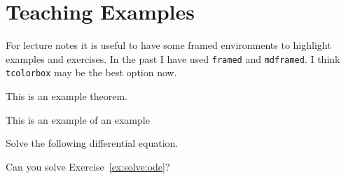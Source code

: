 
\section{Teaching Examples}

For lecture notes it is useful to have some framed environments to highlight examples and exercises. In the past I have used \texttt{framed} and \texttt{mdframed}. I think \texttt{tcolorbox} may be the best option now.


\begin{theorem}
This is an example theorem.
\end{theorem}

\begin{example}
This is an example of an example
\end{example}


\begin{exercise}
  Solve the following differential equation.
  \label{ex:solve:ode}
\end{exercise} 
\noindent Can you solve Exercise~\ref{ex:solve:ode}?


